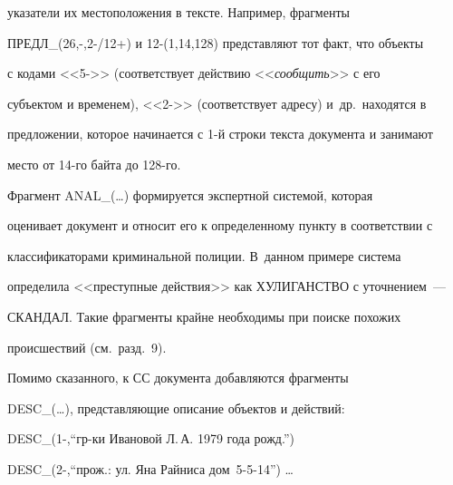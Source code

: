 указатели их местоположения в тексте. Например, фрагменты 


    ПРЕДЛ\_(26,-,2-/12+) и 12-(1,14,128) представляют тот факт, что объекты 


с кодами <<5->> (соответствует действию <<\textit{сообщить}>> с его 


субъектом и временем), <<2->> (соответствует адресу) и~др.\ находятся в 


предложении, которое начинается с 1-й строки текста документа и занимают 


место от 14-го байта до 128-го. 


    


    Фрагмент ANAL\_(\ldots) формируется экспертной системой, которая 


оценивает документ и относит его к определенному пункту в соответствии с 


классификаторами криминальной полиции. В~данном примере сис\-те\-ма 


определила <<преступные действия>> как ХУЛИГАНСТВО с уточнением~--- 


СКАНДАЛ. Такие фрагменты крайне необходимы при поиске похожих 


происшествий (см.\ разд.~9).


    


    Помимо сказанного, к СС документа добавляются фрагменты 


DESC\_(\ldots), представляющие описание объектов и действий: 


    


\smallskip





    {\small


    \noindent


     DESC\_(1-,``гр-ки Ивановой Л.\,А. 1979 года рожд.'')


     


    \noindent


     DESC\_(2-,``прож.: ул. Яна Райниса дом~5-5-14'') \ldots


     }


     


     \smallskip


